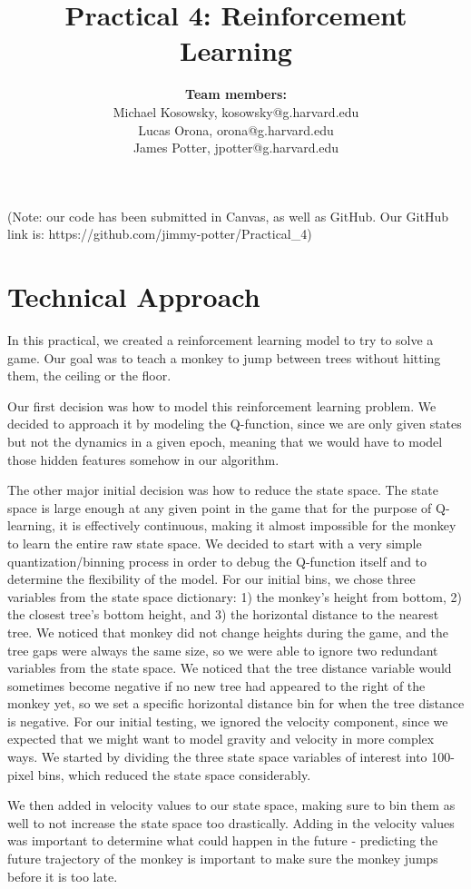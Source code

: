 \documentclass[11pt]{article}
\title{Practical 4: Reinforcement Learning}
\author{\textbf{Team members:}\\ Michael Kosowsky, kosowsky@g.harvard.edu \\ Lucas Orona, orona@g.harvard.edu\\ James Potter, jpotter@g.harvard.edu}
\begin{document}
\maketitle{}

(Note:  our code has been submitted in Canvas, as well as GitHub. Our GitHub link is:    https://github.com/jimmy-potter/Practical\_4)


\section{Technical Approach}

In this practical, we created a reinforcement learning model to try to solve a game. Our goal was to teach a monkey to jump between trees without hitting them, the ceiling or the floor. 

Our first decision was how to model this reinforcement learning problem. We decided to approach it by modeling the Q-function, since we are only given states but not the dynamics in a given epoch, meaning that we would have to model those hidden features somehow in our algorithm. 

The other major initial decision was how to reduce the state space. The state space is large enough at any given point in the game that for the purpose of Q-learning, it is effectively continuous, making it almost impossible for the monkey to learn the entire raw state space. We decided to start with a very simple quantization/binning process in order to debug the Q-function itself and to determine the flexibility of the model. For our initial bins, we chose three variables from the state space dictionary: 1) the monkey's height from bottom, 2) the closest tree's bottom height, and 3) the horizontal distance to the nearest tree. We noticed that monkey did not change heights during the game, and the tree gaps were always the same size, so we were able to ignore two redundant variables from the state space. We noticed that the tree distance variable would sometimes become negative if no new tree had appeared to the right of the monkey yet, so we set a specific horizontal distance bin for when the tree distance is negative. For our initial testing, we ignored the velocity component, since we expected that we might want to model gravity and velocity in more complex ways. We started by dividing the three state space variables of interest into 100-pixel bins, which reduced the state space considerably. 

We then added in velocity values to our state space, making sure to bin them as well to not increase the state space too drastically. Adding in the velocity values was important to determine what could happen in the future - predicting the future trajectory of the monkey is important to make sure the monkey jumps before it is too late.
\end{document}
